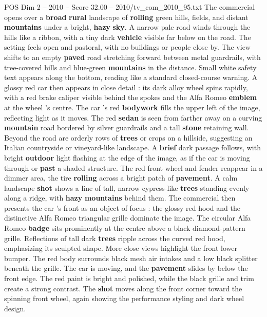 \begin{textsample}{POS Dim 2 – 2010 – Score 32.00 – 2010/tv\_com\_2010\_95.txt}  \label{ex:f2_pos_051}
The commercial opens over a \textbf{broad} \textbf{rural} landscape of \textbf{rolling} green hills, fields, and distant \textbf{mountains} under a bright, \textbf{hazy} \textbf{sky}.
A narrow pale road winds through the hills like a ribbon, with a tiny dark \textbf{vehicle} visible far below on the road.
The setting feels open and pastoral, with no buildings or people close by.
The view shifts to an empty \textbf{paved} road stretching forward between metal guardrails, with tree-covered hills and blue-green \textbf{mountains} in the distance.
Small white safety text appears along the bottom, reading like a standard closed-course warning.
A glossy red car then appears in close detail : its dark alloy wheel spins rapidly, with a red brake caliper visible behind the spokes and the Alfa Romeo \textbf{emblem} at the wheel ’s centre.
The car ’s red \textbf{bodywork} fills the upper left of the image, reflecting light as it moves.
The red \textbf{sedan} is seen from farther away on a curving \textbf{mountain} road bordered by silver guardrails and a tall \textbf{stone} retaining wall.
Beyond the road are orderly rows of \textbf{trees} or crops on a hillside, suggesting an Italian countryside or vineyard-like landscape.
A \textbf{brief} dark passage follows, with bright \textbf{outdoor} light flashing at the edge of the image, as if the car is moving through or \textbf{past} a shaded structure.
The red front wheel and fender reappear in a dimmer area, the tire \textbf{rolling} across a bright patch of \textbf{pavement}.
A calm landscape \textbf{shot} shows a line of tall, narrow cypress-like \textbf{trees} standing evenly along a ridge, with \textbf{hazy} \textbf{mountains} behind them.
The commercial then presents the car ’s front as an object of focus : the glossy red hood and the distinctive Alfa Romeo triangular grille dominate the image.
The circular Alfa Romeo \textbf{badge} sits prominently at the centre above a black diamond-pattern grille.
Reflections of tall dark \textbf{trees} ripple across the curved red hood, emphasizing its sculpted shape.
More close views highlight the front lower bumper.
The red body surrounds black mesh air intakes and a low black splitter beneath the grille.
The car is moving, and the \textbf{pavement} slides by below the front edge.
The red paint is bright and polished, while the black grille and trim create a strong contrast.
The \textbf{shot} moves along the front corner toward the spinning front wheel, again showing the performance styling and dark wheel design.

\end{textsample}
